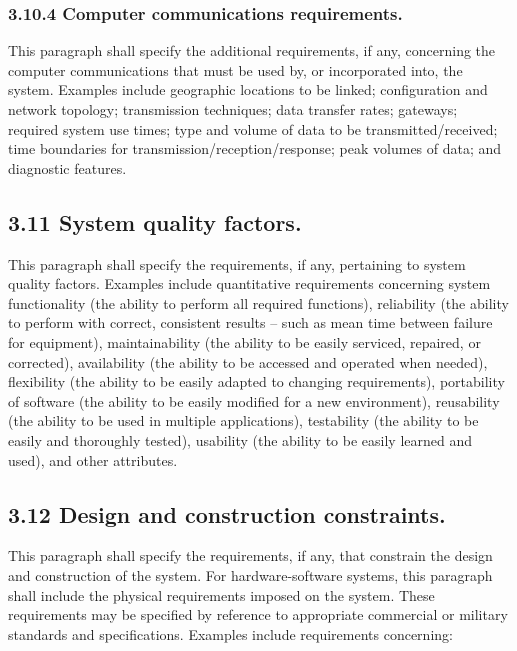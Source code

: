 \subsubsection{3.10.4 Computer communications requirements.}

This paragraph shall specify the additional requirements, if any,
concerning the computer communications that must be used by, or
incorporated into, the system. Examples include geographic locations to
be linked; configuration and network topology; transmission techniques;
data transfer rates; gateways; required system use times; type and
volume of data to be transmitted/received; time boundaries for
transmission/reception/response; peak volumes of data; and diagnostic
features.

\subsection{3.11 System quality factors.}

This paragraph shall specify the requirements, if any, pertaining to
system quality factors. Examples include quantitative requirements
concerning system functionality (the ability to perform all required
functions), reliability (the ability to perform with correct, consistent
results -- such as mean time between failure for equipment),
maintainability (the ability to be easily serviced, repaired, or
corrected), availability (the ability to be accessed and operated when
needed), flexibility (the ability to be easily adapted to changing
requirements), portability of software (the ability to be easily
modified for a new environment), reusability (the ability to be used in
multiple applications), testability (the ability to be easily and
thoroughly tested), usability (the ability to be easily learned and
used), and other attributes.

\subsection{3.12 Design and construction constraints.}

This paragraph shall specify the requirements, if any, that constrain
the design and construction of the system. For hardware-software
systems, this paragraph shall include the physical requirements imposed
on the system. These requirements may be specified by reference to
appropriate commercial or military standards and specifications.
Examples include requirements concerning:

